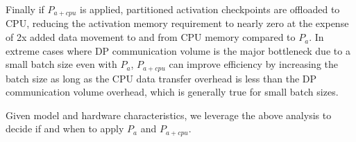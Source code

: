 \documentclass{article}
\begin{document}
Finally if $P_{a+cpu}$ is applied, partitioned activation checkpoints are offloaded to CPU, reducing the activation memory requirement to nearly zero at the expense of 2x added data movement to and from CPU memory compared to $P_a$. In extreme cases where DP communication volume is the major bottleneck due to a small batch size even with $P_a$, $P_{a+cpu}$ can improve efficiency by increasing the batch size as long as the CPU data transfer overhead is less than the DP communication volume overhead, which is generally true for small batch sizes.  

Given model and hardware characteristics, we leverage the above analysis to decide if and when to apply $P_a$ and $P_{a+cpu}$.  

\end{document}
